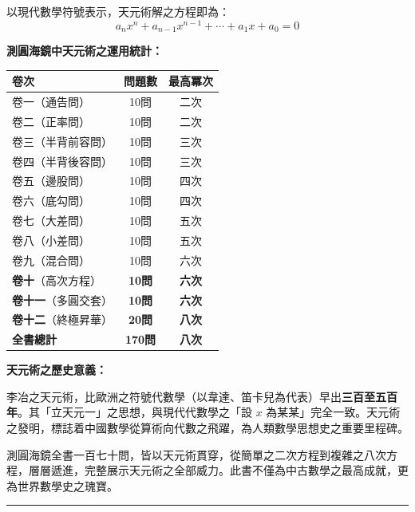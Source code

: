 \documentclass[11pt,a4paper]{article}
\newcommand{\longline}{\noindent\rule{\textwidth}{0.4pt}}
\begin{document}
以現代數學符號表示，天元術解之方程即為：
$$a_n x^n + a_{n-1} x^{n-1} + \cdots + a_1 x + a_0 = 0$$

\vspace{0.3cm}

\textbf{測圓海鏡中天元術之運用統計：}
\begin{center}
\begin{tabular}{l|c|c}
\textbf{卷次} & \textbf{問題數} & \textbf{最高冪次} \\
\hline
卷一（通告問） & 10問 & 二次 \\
卷二（正率問） & 10問 & 二次 \\
卷三（半背前容問） & 10問 & 三次 \\
卷四（半背後容問） & 10問 & 三次 \\
卷五（邊股問） & 10問 & 四次 \\
卷六（底勾問） & 10問 & 四次 \\
卷七（大差問） & 10問 & 五次 \\
卷八（小差問） & 10問 & 五次 \\
卷九（混合問） & 10問 & 六次 \\
\textbf{卷十}（高次方程） & \textbf{10問} & \textbf{六次} \\
\textbf{卷十一}（多圓交套） & \textbf{10問} & \textbf{六次} \\
\textbf{卷十二}（終極昇華） & \textbf{20問} & \textbf{八次} \\
\hline
\textbf{全書總計} & \textbf{170問} & \textbf{八次} \\
\hline
\end{tabular}
\end{center}

\vspace{0.5cm}

\textbf{天元術之歷史意義：}

李冶之天元術，比歐洲之符號代數學（以韋達、笛卡兒為代表）早出\textbf{三百至五百年}。其「立天元一」之思想，與現代代數學之「設 $x$ 為某某」完全一致。天元術之發明，標誌着中國數學從算術向代數之飛躍，為人類數學思想史之重要里程碑。

測圓海鏡全書一百七十問，皆以天元術貫穿，從簡單之二次方程到複雜之八次方程，層層遞進，完整展示天元術之全部威力。此書不僅為中古數學之最高成就，更為世界數學史之瑰寶。

\vspace{0.5cm}
\longline

\newpage

\end{document}
